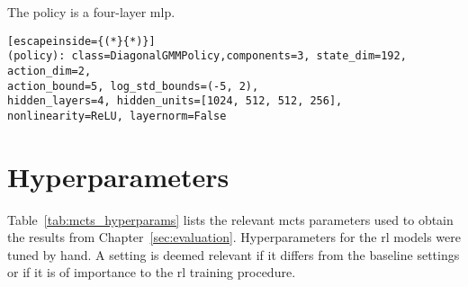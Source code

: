 The policy is a four-layer \gls{mlp}.
\label{code:policy}\begin{lstlisting}[escapeinside={(*}{*)}]
(policy): class=DiagonalGMMPolicy,components=3, state_dim=192, action_dim=2,
action_bound=5, log_std_bounds=(-5, 2), 
hidden_layers=4, hidden_units=[1024, 512, 512, 256], 
nonlinearity=ReLU, layernorm=False
\end{lstlisting}


\section{Hyperparameters}\label{app:hyperparameter_settings}
Table~\ref{tab:mcts_hyperparams} lists the relevant \gls{mcts} parameters used to obtain the results from Chapter~\ref{sec:evaluation}. Hyperparameters for the \gls{rl} models were tuned by hand. A setting is deemed relevant if it differs from the baseline settings or if it is of importance to the \gls{rl} training procedure.
